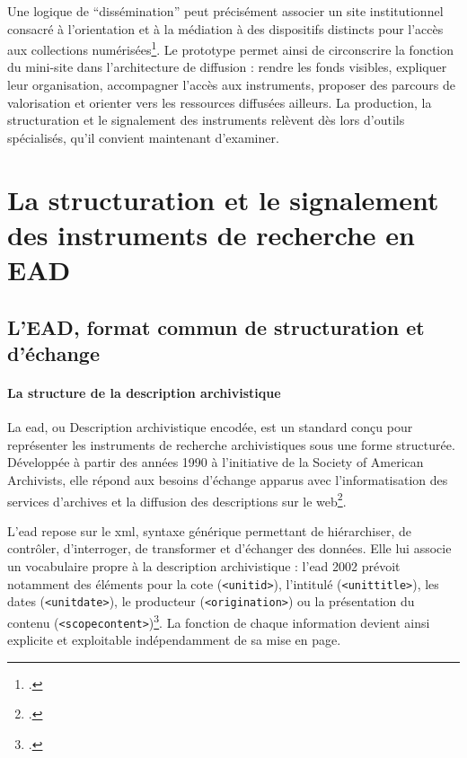 Une logique de \enquote{dissémination} peut précisément associer un site institutionnel consacré à l'orientation et à la médiation à des dispositifs distincts pour l'accès aux collections numérisées\footcite[p.~156]{Halais2012}. Le prototype permet ainsi de circonscrire la fonction du mini-site dans l'architecture de diffusion : rendre les fonds visibles, expliquer leur organisation, accompagner l'accès aux instruments, proposer des parcours de valorisation et orienter vers les ressources diffusées ailleurs. La production, la structuration et le \gls{signalement} des instruments relèvent dès lors d'outils spécialisés, qu'il convient maintenant d'examiner.

\section{La structuration et le signalement des instruments de recherche en EAD}
\label{sec:structuration-signalement-ead}

\subsection{L'EAD, format commun de structuration et d'échange}
\label{subsec:ead-format-echange}

\paragraph{La structure de la description archivistique}

La \gls{ead}, ou Description archivistique encodée, est un standard conçu pour représenter les instruments de recherche archivistiques sous une forme structurée. Développée à partir des années 1990 à l'initiative de la Society of American Archivists, elle répond aux besoins d'échange apparus avec l'informatisation des services d'archives et la diffusion des descriptions sur le web\footcite[pp.~84--85]{Sibille2012}.

L'\gls{ead} repose sur le \gls{xml}, syntaxe générique permettant de hiérarchiser, de contrôler, d'interroger, de transformer et d'échanger des données. Elle lui associe un vocabulaire propre à la description archivistique : l'\gls{ead} 2002 prévoit notamment des éléments pour la cote (\texttt{<unitid>}), l'intitulé (\texttt{<unittitle>}), les dates (\texttt{<unitdate>}), le producteur (\texttt{<origination>}) ou la présentation du contenu (\texttt{<scopecontent>})\footcite{EAD2002Dictionnaire}. La fonction de chaque information devient ainsi explicite et exploitable indépendamment de sa mise en page.

